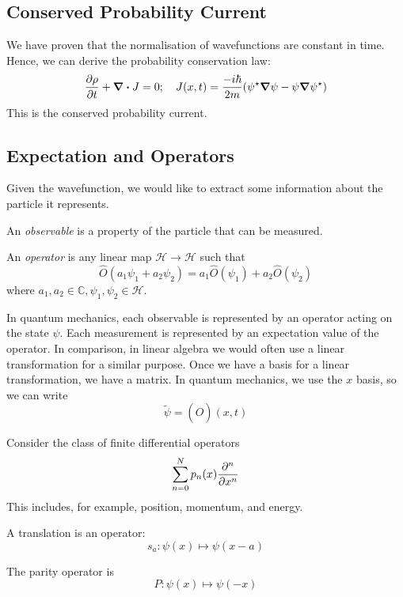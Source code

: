 \subsection{Conserved Probability Current}
We have proven that the normalisation of wavefunctions are constant in time.
Hence, we can derive the probability conservation law:
\[ \pdv{\rho}{t}(x,t) + \div{J} = 0;\quad J(x,t) = \frac{-i\hbar}{2m} \qty(\psi^\star \grad{\psi} - \psi \grad{\psi^\star} ) \]
This is the conserved probability current.

\subsection{Expectation and Operators}
Given the wavefunction, we would like to extract some information about the particle it represents.
\begin{definition}
	An \textit{observable} is a property of the particle that can be measured.
\end{definition}
\begin{definition}
	An \textit{operator} is any linear map \( \mathcal H \to \mathcal H \) such that
	\[ \hat O(a_1 \psi_1 + a_2 \psi_2) = a_1 \hat O(\psi_1) + a_2 \hat O(\psi_2) \]
	where \( a_1, a_2 \in \mathbb C, \psi_1, \psi_2 \in \mathcal H \).
\end{definition}
\noindent In quantum mechanics, each observable is represented by an operator acting on the state \( \psi \).
Each measurement is represented by an expectation value of the operator.
In comparison, in linear algebra we would often use a linear transformation for a similar purpose.
Once we have a basis for a linear transformation, we have a matrix.
In quantum mechanics, we use the \( x \) basis, so we can write
\[ \widetilde \psi = (\hat O)(x, t) \]
\begin{example}
	Consider the class of finite differential operators
	\[ \sum_{n=0}^N p_n(x) \pdv[n]{x} \]
	This includes, for example, position, momentum, and energy.
\end{example}
\begin{example}
	A translation is an operator:
	\[ s_a \colon \psi(x) \mapsto \psi(x-a) \]
\end{example}
\begin{example}
	The parity operator is
	\[ P \colon \psi(x) \mapsto \psi(-x) \]
\end{example}


